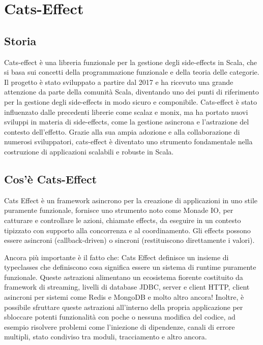 \chapter{Cats-Effect}

\section{Storia}
Cats-effect è una libreria funzionale per la gestione degli side-effects in Scala, che si basa sui concetti della programmazione funzionale e della teoria delle categorie. Il progetto è stato sviluppato a partire dal 2017 e ha ricevuto una grande attenzione da parte della comunità Scala, diventando uno dei punti di riferimento per la gestione degli side-effects in modo sicuro e componibile. Cats-effect è stato influenzato dalle precedenti librerie come scalaz e monix, ma ha portato nuovi sviluppi in materia di side-effects, come la gestione asincrona e l'astrazione del contesto dell'effetto. Grazie alla sua ampia adozione e alla collaborazione di numerosi sviluppatori, cats-effect è diventato uno strumento fondamentale nella costruzione di applicazioni scalabili e robuste in Scala.

\section{Cos'è Cats-Effect}
Cats Effect è un framework asincrono per la creazione di applicazioni in uno stile puramente funzionale, fornisce uno strumento noto come Monade IO, per catturare e controllare le azioni, chiamate effects, da eseguire in un contesto tipizzato con supporto alla concorrenza e al coordinamento. Gli effects possono essere asincroni (callback-driven) o sincroni (restituiscono direttamente i valori). 

\noindent Ancora più importante è il fatto che: Cats Effect definisce un insieme di typeclasses che definiscono cosa significa essere un sistema di runtime puramente funzionale. Queste astrazioni alimentano un ecosistema fiorente costituito da framework di streaming, livelli di database JDBC, server e client HTTP, client asincroni per sistemi come Redis e MongoDB e molto altro ancora! Inoltre, è possibile sfruttare queste astrazioni all'interno della propria applicazione per sbloccare potenti funzionalità con poche o nessuna modifica del codice, ad esempio risolvere problemi come l'iniezione di dipendenze, canali di errore multipli, stato condiviso tra moduli, tracciamento e altro ancora.

